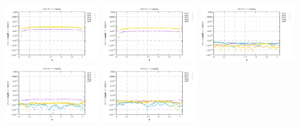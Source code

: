 \noindent
\includegraphics[width=3.5cm]{python_codes/fieldstone_152/RESULTS/exp1_2D/vel_32_m2}
\includegraphics[width=3.5cm]{python_codes/fieldstone_152/RESULTS/exp1_2D/vel_32_m3}
\includegraphics[width=3.5cm]{python_codes/fieldstone_152/RESULTS/exp1_2D/vel_32_m4}
\includegraphics[width=3.5cm]{python_codes/fieldstone_152/RESULTS/exp1_2D/vel_32_m5}
\includegraphics[width=3.5cm]{python_codes/fieldstone_152/RESULTS/exp1_2D/vel_32_m6}

